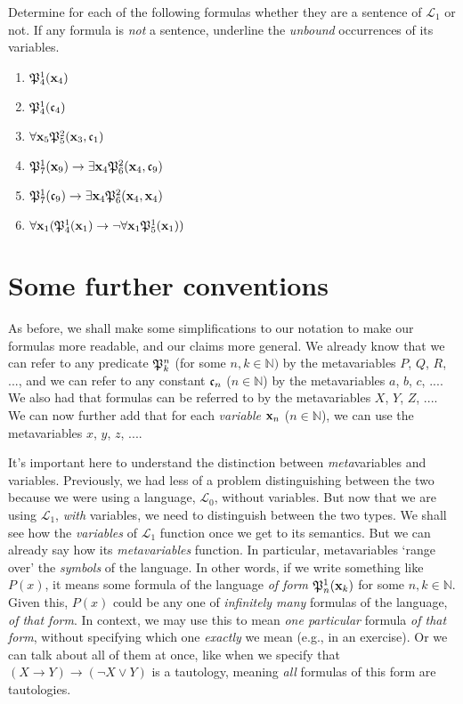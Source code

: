 \begin{exc}
Determine for each of the following formulas whether they are a sentence of $\mathcal{L}_1$ or not. If any formula is \textit{not} a sentence, underline the \textit{unbound} occurrences of its variables. 

\begin{enumerate}
	\item $\mathfrak{P}^{1}_{4}(\mathbf{x}_{4})$
	\item $\mathfrak{P}^{1}_{4}(\mathfrak{c}_{4})$
	\item $\forall \mathbf{x}_{5}\mathfrak{P}^{2}_{5}(\mathbf{x}_{3}, \mathfrak{c}_{1})$
	\item $\mathfrak{P}^{1}_{7}(\mathbf{x}_{9}) \rightarrow \exists \mathbf{x}_{4}\mathfrak{P}^{2}_{6}(\mathbf{x}_{4}, \mathfrak{c}_{9})$
	\item $\mathfrak{P}^{1}_{7}(\mathfrak{c}_{9}) \rightarrow \exists \mathbf{x}_{4}\mathfrak{P}^{2}_{6}(\mathbf{x}_{4}, \mathbf{x}_{4})$
	\item $\forall \mathbf{x}_{1} (\mathfrak{P}^{1}_{4}(\mathbf{x}_{1}) \rightarrow \neg \forall \mathbf{x}_{1} \mathfrak{P}^{1}_{5}(\mathbf{x}_{1}))$
\end{enumerate}
\end{exc}

\section{Some further conventions}

As before, we shall make some simplifications to our notation to make our formulas more readable, and our claims more general. We already know that we can refer to any predicate $\mathfrak{P}^{n}_{k}$ (for some $n, k \in \mathbb{N})$ by the metavariables $P$, $Q$, $R$, $...$, and we can refer to any constant $\mathfrak{c}_{n}$ ($n \in \mathbb{N}$) by the metavariables $a$, $b$, $c$, $...$. We also had that formulas can be referred to by the metavariables $X$, $Y$, $Z$, $...$. We can now further add that for each \textit{variable} $\mathbf{x}_{n}$ ($n \in \mathbb{N}$), we can use the metavariables $x$, $y$, $z$, $...$. 

It's important here to understand the distinction between \textit{meta}variables and variables. Previously, we had less of a problem distinguishing between the two because we were using a language, $\mathcal{L}_0$, without variables. But now that we are using $\mathcal{L}_1$, \textit{with} variables, we need to distinguish between the two types. We shall see how the \textit{variables} of $\mathcal{L}_1$ function once we get to its semantics. But we can already say how its \textit{metavariables} function. In particular, metavariables `range over' the \textit{symbols} of the language. In other words, if we write something like $P(x)$, it means some formula of the language \textit{of form} $\mathfrak{P}^{1}_{n}(\mathbf{x}_{k})$ for some $n, k \in \mathbb{N}$. Given this, $P(x)$ could be any one of \textit{infinitely many} formulas of the language, \textit{of that form}. In context, we may use this to mean \textit{one particular} formula \textit{of that form}, without specifying which one \textit{exactly} we mean (e.g., in an exercise). Or we can talk about all of them at once, like when we specify that $(X \rightarrow Y) \rightarrow (\neg X \vee Y)$ is a tautology, meaning \textit{all} formulas of this form are tautologies. 

